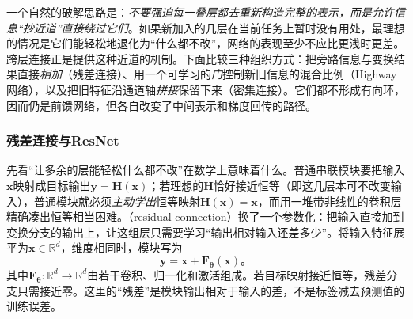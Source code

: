 一个自然的破解思路是：\emph{不要强迫每一叠层都去重新构造完整的表示，而是允许信息“抄近道”直接绕过它们}。如果新加入的几层在当前任务上暂时没有用处，最理想的情况是它们能轻松地退化为“什么都不改”，网络的表现至少不应比更浅时更差。跨层连接正是提供这种近道的机制。下面比较三种组织方式：把旁路信息与变换结果直接\emph{相加}（残差连接）、用一个可学习的\emph{门}控制新旧信息的混合比例（Highway网络），以及把旧特征沿通道轴\emph{拼接}保留下来（密集连接）。它们都不形成有向环，因而仍是前馈网络，但各自改变了中间表示和梯度回传的路径。

\subsubsection{残差连接与ResNet}
\label{sec:cnn-resnet}

先看“让多余的层能轻松什么都不改”在数学上意味着什么。普通串联模块要把输入$\bm x$映射成目标输出$\bm y=\bm H(\bm x)$；若理想的$\bm H$恰好接近恒等（即这几层本可不改变输入），普通模块就必须\emph{主动学出}恒等映射$\bm H(\bm x)=\bm x$，而用一堆带非线性的卷积层精确凑出恒等相当困难。（residual connection）换了一个参数化：把输入直接加到变换分支的输出上，让这组层只需要学习“输出相对输入还差多少”。将输入特征展平为$\bm x\in\mathbb R^d$，维度相同时，模块写为
\begin{equation}
  \bm y=\bm x+\bm F_{\bm\theta}(\bm x)\text{。}
  \label{eq:cnn-residual-block}
\end{equation}
其中$\bm F_{\bm\theta}:\mathbb R^d\to\mathbb R^d$由若干卷积、归一化和激活组成。若目标映射接近恒等，残差分支只需接近零。这里的“残差”是模块输出相对于输入的差，不是标签减去预测值的训练误差。

